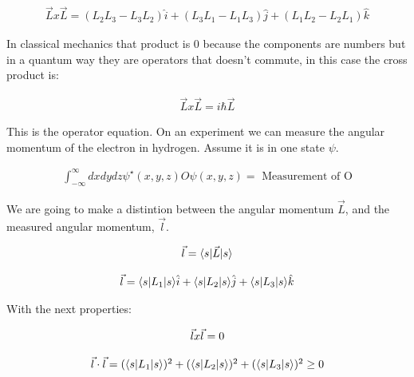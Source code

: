 \begin{equation}
  \begin{array}{c}
    \vec{L} x \vec{L} = (L_2 L_3 - L_3L_2)\hat{i} + (L_3L_1 - L_1L_3)\hat{j} + (L_1L_2 - L_2L_1)\hat{k}
  \end{array}
\end{equation}

In classical mechanics that product is 0 because the components are numbers but in a quantum way they are operators that doesn't commute, in this case the cross product is:

\begin{equation}
  \begin{array}{c}
    \vec{L} x \vec{L} = i\hbar \vec{L}
  \end{array}
\end{equation}

This is the operator equation. On an experiment we can measure the angular momentum of the electron in hydrogen. Assume it is in one state $\psi$.

\begin{equation}
  \begin{array}{c}
    \int_{-\infty}^{\infty} dxdydz \psi^{\star}(x,y,z) O \psi(x,y,z) = \text{ Measurement of O}
  \end{array}
\end{equation}

We are going to make a distintion between the angular momentum $\vec{L}$, and the measured angular momentum, $\vec{l}$.

\begin{equation}
  \begin{array}{c}
    \vec{l} = \langle s\rvert\vec{L}\lvert s\rangle
    \\

    \\
    \vec{l} = \langle s\rvert L_1\lvert s\rangle\hat{i} + \langle s\rvert L_2\lvert s\rangle\hat{j} + \langle s\rvert L_3\lvert s\rangle\hat{k}
  \end{array}
\end{equation}

With the next properties:

\begin{equation}
  \begin{array}{c}
    \vec{l} x \vec{l} = 0
    \\

    \\
    \vec{l} \cdot \vec{l} = (\langle s\rvert L_1\lvert s\rangle)^2 + (\langle s\rvert L_2\lvert s\rangle)^2 + (\langle s\rvert L_3\lvert s\rangle)^2 \geq 0
  \end{array}
\end{equation}

